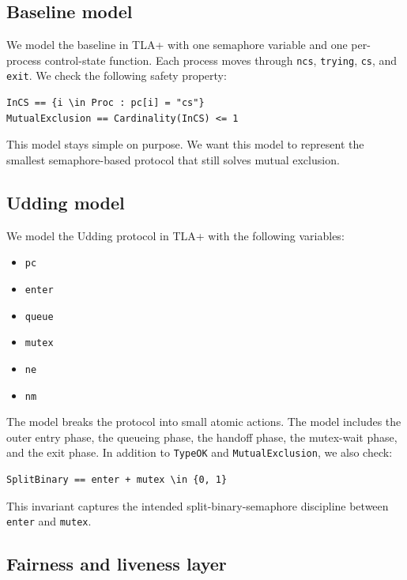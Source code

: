 \documentclass[11pt]{article}
\begin{document}
\subsection{Baseline model}

We model the baseline in TLA+ with one semaphore variable and one per-process control-state function. Each process moves through \texttt{ncs}, \texttt{trying}, \texttt{cs}, and \texttt{exit}. We check the following safety property:

\begin{lstlisting}[language=TLA]
InCS == {i \in Proc : pc[i] = "cs"}
MutualExclusion == Cardinality(InCS) <= 1
\end{lstlisting}

This model stays simple on purpose. We want this model to represent the smallest semaphore-based protocol that still solves mutual exclusion.

\subsection{Udding model}

We model the Udding protocol in TLA+ with the following variables:

\begin{itemize}
  \item \texttt{pc}
  \item \texttt{enter}
  \item \texttt{queue}
  \item \texttt{mutex}
  \item \texttt{ne}
  \item \texttt{nm}
\end{itemize}

The model breaks the protocol into small atomic actions. The model includes the outer entry phase, the queueing phase, the handoff phase, the mutex-wait phase, and the exit phase. In addition to \texttt{TypeOK} and \texttt{MutualExclusion}, we also check:

\begin{lstlisting}[language=TLA]
SplitBinary == enter + mutex \in {0, 1}
\end{lstlisting}

This invariant captures the intended split-binary-semaphore discipline between \texttt{enter} and \texttt{mutex}.

\subsection{Fairness and liveness layer}
\end{document}
